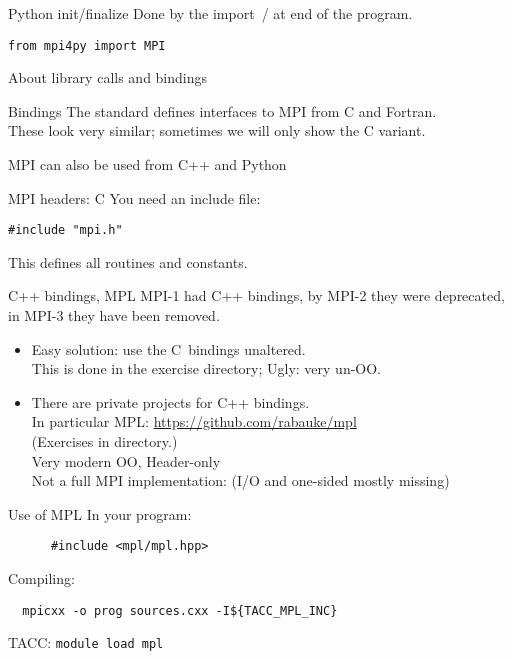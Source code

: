 \begin{python}
  \addtocounter{slidecount}{-1}
\begin{numberedframe}{Python init/finalize}
    Done by the import~/ at end of the program.
\begin{verbatim}
from mpi4py import MPI
\end{verbatim}
\end{numberedframe}
\end{python}

\begin{exerciseframe}[hello]
  
\end{exerciseframe}

 {About library calls and bindings}

\begin{numberedframe}{Bindings}
  The standard defines interfaces to MPI
  from C and Fortran.\\
  These look very similar;
  sometimes we will only show the C variant.

  MPI can also be used from C++ and Python
\end{numberedframe}

\begin{numberedframe}{MPI headers: C}
\label{sl:mpi-header-c}
You need an include file:
\begin{verbatim}
#include "mpi.h"
\end{verbatim}
This defines all routines and constants.
\end{numberedframe}

\begin{mpl}
  \addtocounter{slidecount}{-1}
\begin{numberedframe}{C++ bindings, MPL}
  MPI-1 had C++ bindings, by MPI-2 they were deprecated, in MPI-3 they have been removed.
  \begin{itemize}
  \item Easy solution: use the C~bindings unaltered.\\
    This is done in the  exercise directory;  Ugly: very un-OO.
  \item There are private projects for C++ bindings.\\
    In particular
    MPL: \url{https://github.com/rabauke/mpl}\\
    (Exercises in  directory.)\\
    Very modern OO,  Header-only\\
    Not a full MPI implementation: (I/O and one-sided mostly missing)
  \end{itemize}
\end{numberedframe}
\begin{numberedframe}{Use of MPL}
    In your program:
    \begin{lstlisting}
      #include <mpl/mpl.hpp>
  \end{lstlisting}
    Compiling:
\begin{verbatim}
  mpicxx -o prog sources.cxx -I${TACC_MPL_INC}
\end{verbatim}
TACC: \texttt{module load mpl}
\end{numberedframe}
\end{mpl}

